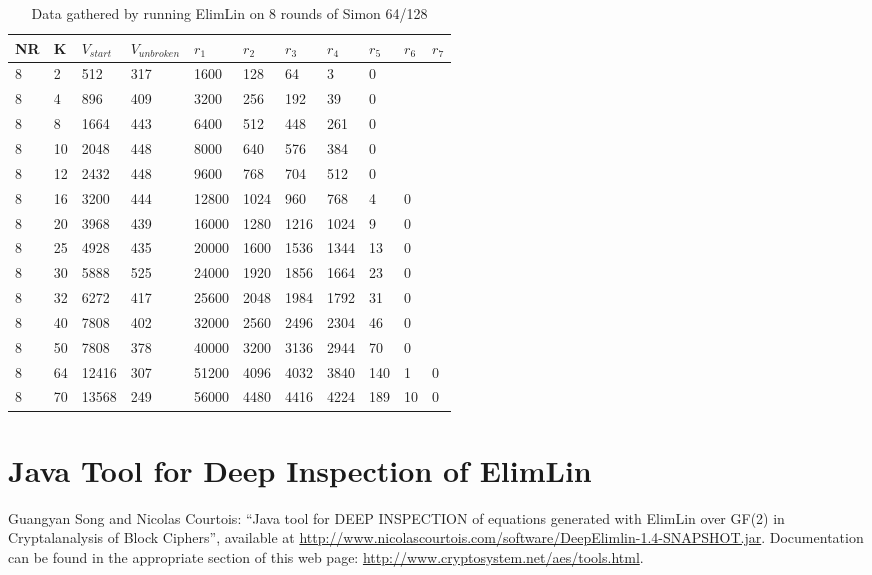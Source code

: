 \begin{table}[h!]
	\centering
	\caption{Data gathered by running ElimLin on 8 rounds of Simon 64/128}
	\label{tbl:fullResultsSecrypt20168R}
	\begin{tabular}{lllllllllll}
		NR & K & $V_{start}$ & $V_{unbroken}$ & $r_1$   & $r_2$  & $r_3$  & $r_4$ & $r_5$ & $r_6$ & $r_7$ \\ \hline
		8  & 2 & 512    & 317       & 1600 & 128 & 64  & 3  & 0  &    &    \\
		8  & 4 & 896    & 409       & 3200 & 256 & 192 & 39 & 0  &    &    \\
		8  & 8 & 1664    & 443       & 6400 & 512 & 448 & 261 & 0  &    &   \\
		8 & 10 & 2048    & 448       & 8000 & 640 & 576  & 384  & 0  &    &    \\
		8 & 12 & 2432    & 448       & 9600 & 768 & 704 & 512 & 0  &    &    \\
		8  & 16 & 3200   & 444       & 12800 & 1024 & 960 & 768 & 4  &   0 &   \\
		8  & 20 & 3968    & 439       & 16000 & 1280 & 1216  & 1024  & 9 &   0 &    \\
		8 & 25 & 4928    & 435       & 20000 & 1600 & 1536 & 1344 & 13  &  0  &    \\
		8  & 30 & 5888    & 525       & 24000 & 1920 & 1856 & 1664 & 23  & 0   &   \\
		8 & 32 & 6272    & 417       & 25600 & 2048 & 1984 & 1792 & 31  &  0  &    \\
		8  & 40 & 7808    & 402       & 32000 & 2560 & 2496 & 2304 & 46  & 0   &   \\
		8 & 50 & 7808    & 378       & 40000 & 3200 & 3136 & 2944 & 70  &  0  &    \\
		8  & 64 & 12416    & 307       & 51200 & 4096 & 4032  & 3840  & 140  &  1  & 0   \\
		8  & 70 & 13568    & 249       & 56000 & 4480 & 4416 & 4224 & 189  & 10   & 0    
		
	\end{tabular}
\end{table}
\chapter{Java Tool for Deep Inspection of ElimLin}
Guangyan Song and Nicolas Courtois:
``Java tool for DEEP INSPECTION of equations generated with ElimLin over GF(2)
in Cryptalanalysis of Block Ciphers'',
available at
\url{http://www.nicolascourtois.com/software/DeepElimlin-1.4-SNAPSHOT.jar}. Documentation can be found in the appropriate section of this web page:
\url{http://www.cryptosystem.net/aes/tools.html}.

